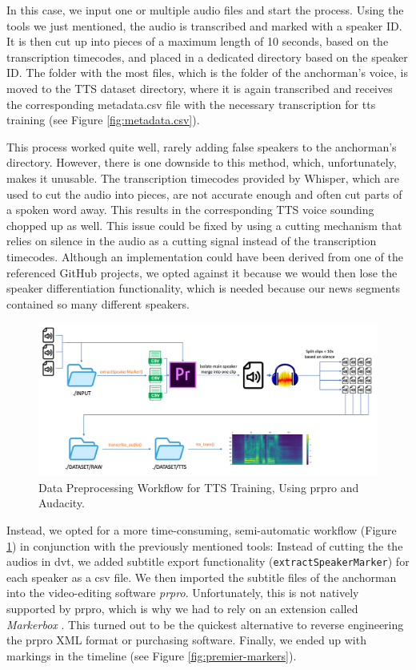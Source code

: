 \documentclass[
  a4paper,  %
  twoside,  %
  bibliography=totoc,
  headsepline,
  cleardoublepage=empty,
  parskip=half,
  draft=false
]{scrbook}
\begin{document}
In this case, we input one or multiple audio files and start the process. Using the tools we just mentioned, the audio is transcribed and marked with a speaker ID.
It is then cut up into pieces of a maximum length of 10 seconds, based on the transcription timecodes, and placed in a dedicated directory based on the speaker ID. The folder with the most files, which is the folder of the anchorman's voice, is moved to the TTS dataset directory, where it is again transcribed and receives the corresponding metadata.csv file with the necessary transcription for \gls{tts} training (see Figure \ref{fig:metadata.csv}).

This process worked quite well, rarely adding false speakers to the anchorman's directory. However, there is one downside to this method, which, unfortunately, makes it unusable. The transcription timecodes provided by Whisper, which are used to cut the audio into pieces, are not accurate enough and often cut parts of a spoken word away. This results in the corresponding TTS voice sounding chopped up as well. This issue could be fixed by using a cutting mechanism that relies on silence in the audio as a cutting signal instead of the transcription timecodes. Although an implementation could have been derived from one of the referenced GitHub projects, we opted against it because we would then lose the speaker differentiation functionality, which is needed because our news segments contained so many different speakers.

\begin{figure}[h]
  \centering
  \includegraphics[width=1\textwidth]{./graphics/tts/tts prpro.png}
  \caption{Data Preprocessing Workflow for TTS Training, Using \gls{prpro} and Audacity.}
  \label{fig:dvt-tts-wf}
\end{figure}

Instead, we opted for a more time-consuming, semi-automatic workflow (Figure \ref{fig:dvt-tts-wf}) in conjunction with the previously mentioned tools: Instead of cutting the the audios in \gls{dvt}, we added subtitle export functionality (\verb|extractSpeakerMarker|) for each speaker as a csv file. We then imported the subtitle files of the anchorman into the video-editing software \textit{\gls{prpro}}. Unfortunately, this is not natively supported by \gls{prpro}, which is why we had to rely on an extension called \textit{Markerbox} \cite{montgomeryMARKERBOXFreeMarker}. This turned out to be the quickest alternative to reverse engineering the \gls{prpro} XML format or purchasing software. Finally, we ended up with markings in the timeline (see Figure \ref{fig:premier-markers}). 
\end{document}
